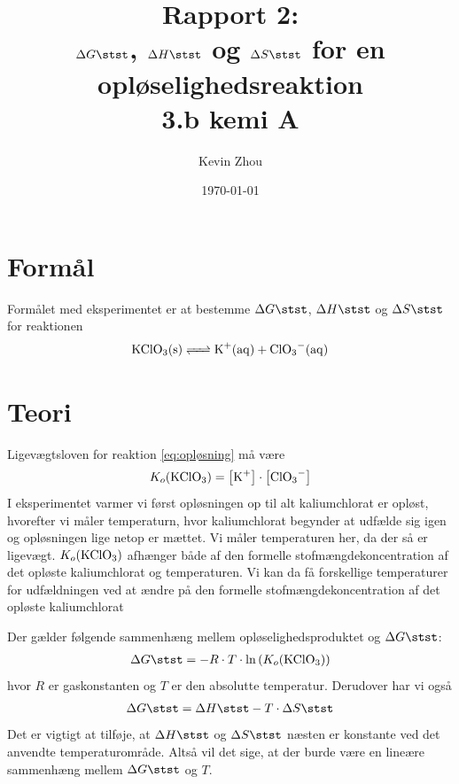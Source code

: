\documentclass{report}
\title{Rapport 2:\\ $\Delta G \stst$, $\Delta H \stst $ og $\Delta S \stst $ for en opløselighedsreaktion\\
{\Large \textbf{3.b kemi A}}}
\author{Kevin Zhou}
\date{\today}
\begin{document}
\maketitle
\section*{Formål}
Formålet med eksperimentet er at bestemme $\Delta G \stst $, $\Delta H \stst $ og $\Delta S \stst $ for reaktionen
\begin{equation}
\label{eq:opløsning}
\begin{split}
\ce{KClO3(s) <=> K+(aq) + ClO3-(aq)} 
\end{split}
\end{equation}
\section*{Teori}
Ligevægtsloven for reaktion \ref{eq:opløsning} må være
\begin{equation}
\label{eq:ligevægt}
\begin{split}
K_o(\ce{KClO3} )=\left[\ce{K+} \right] \cdot \left[\ce{ClO3-} \right]
\end{split}
\end{equation}
I eksperimentet varmer vi først opløsningen op til alt kaliumchlorat er opløst, hvorefter vi måler temperaturn, hvor kaliumchlorat begynder at udfælde sig igen og opløsningen lige netop er mættet.
Vi måler temperaturen her, da der så er ligevægt.
$K_o(\ce{KClO3} )$ afhænger både af den formelle stofmængdekoncentration af det opløste kaliumchlorat og temperaturen.
Vi kan da få forskellige temperaturer for udfældningen ved at ændre på den formelle stofmængdekoncentration af det opløste kaliumchlorat

Der gælder følgende sammenhæng mellem opløselighedsproduktet og $\Delta G \stst $:
\begin{equation}
\begin{split}
  \Delta G \stst = -R \cdot T \cdot \ln\left(K_o(\ce{KClO3} )\right) 
\end{split}
\end{equation}
hvor $R$ er gaskonstanten og $T$ er den absolutte temperatur.  
Derudover har vi også
\begin{equation}
  \label{eq:GafT}
\begin{split}
  \Delta G \stst = \Delta H \stst - T \cdot \Delta S \stst 
\end{split}
\end{equation}
Det er vigtigt at tilføje, at $\Delta H \stst $ og $\Delta S \stst $ næsten er konstante ved det anvendte temperaturområde. 
Altså vil det sige, at der burde være en lineære sammenhæng mellem $\Delta G \stst $ og $T$. 
\end{document}

